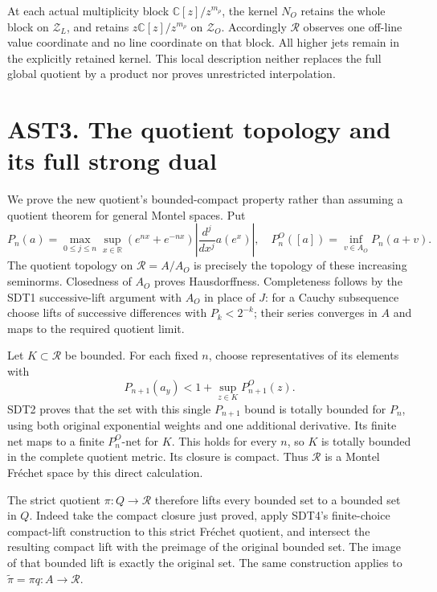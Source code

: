 At each actual multiplicity block \(\mathbb C[z]/z^{m_\rho}\), the
kernel \(N_O\) retains the whole block on \(\mathscr Z_L\), and retains
\(z\mathbb C[z]/z^{m_\rho}\) on \(\mathscr Z_O\). Accordingly
\(\mathcal R\) observes one off-line value coordinate and no line
coordinate on that block. All higher jets remain in the explicitly
retained kernel. This local description neither replaces the full global
quotient by a product nor proves unrestricted interpolation.

\section{AST3. The quotient topology and its full strong
dual}\label{ast3.-the-quotient-topology-and-its-full-strong-dual}

We prove the new quotient's bounded-compact property rather than
assuming a quotient theorem for general Montel spaces. Put \[
P_n(a)=\max_{0\le j\le n}\sup_{x\in\mathbb R}
(e^{nx}+e^{-nx})\left|\frac{d^j}{dx^j}a(e^x)\right|,
\quad
P_n^O([a])=\inf_{v\in A_O}P_n(a+v).
\tag{AST3.1}
\] The quotient topology on \(\mathcal R=A/A_O\) is precisely the
topology of these increasing seminorms. Closedness of \(A_O\) proves
Hausdorffness. Completeness follows by the SDT1 successive-lift argument
with \(A_O\) in place of \(J\): for a Cauchy subsequence choose lifts of
successive differences with \(P_k<2^{-k}\); their series converges in
\(A\) and maps to the required quotient limit.

Let \(K\subset\mathcal R\) be bounded. For each fixed \(n\), choose
representatives of its elements with \[
P_{n+1}(a_y)<1+\sup_{z\in K}P_{n+1}^O(z).
\tag{AST3.2}
\] SDT2 proves that the set with this single \(P_{n+1}\) bound is
totally bounded for \(P_n\), using both original exponential weights and
one additional derivative. Its finite net maps to a finite \(P_n^O\)-net
for \(K\). This holds for every \(n\), so \(K\) is totally bounded in
the complete quotient metric. Its closure is compact. Thus
\(\mathcal R\) is a Montel Fréchet space by this direct calculation.

The strict quotient \(\pi:Q\to\mathcal R\) therefore lifts every bounded
set to a bounded set in \(Q\). Indeed take the compact closure just
proved, apply SDT4's finite-choice compact-lift construction to this
strict Fréchet quotient, and intersect the resulting compact lift with
the preimage of the original bounded set. The image of that bounded lift
is exactly the original set. The same construction applies to
\(\widetilde\pi=\pi q:A\to\mathcal R\).

